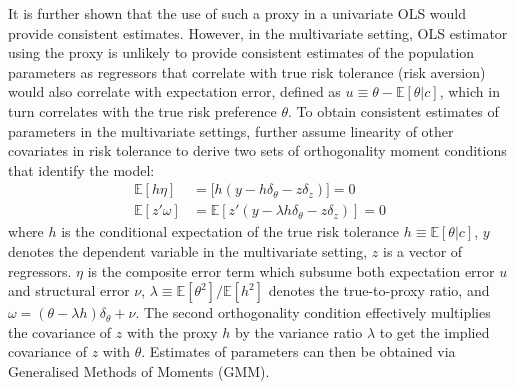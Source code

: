 \documentclass[]{article}
\begin{document}
It is further shown that the use of such a proxy in a univariate OLS would provide consistent estimates. However, in the multivariate setting, OLS estimator using the proxy is unlikely to provide consistent estimates of the population parameters as regressors that correlate with true risk tolerance (risk aversion) would also correlate with expectation error, defined as $u\equiv\theta-\mathbb E[\theta|c]$, which in turn correlates with the true risk preference $\theta$. To obtain consistent estimates of parameters in the multivariate settings, \citet{kimball2008imputing} further assume linearity of other covariates in risk tolerance to derive two sets of orthogonality moment conditions that identify the model: 
\begin{align}
\mathbb E[h\eta]&=\mathbb [h(y-h\delta_\theta-z\delta_z)]=0\\
\mathbb E[z'\omega]&=\mathbb E[z'(y-\lambda h\delta_\theta-z\delta_z)]=0
\end{align}
where $h$ is the conditional expectation of the true risk tolerance $h\equiv \mathbb E[\theta|c]$, $y$ denotes the dependent variable in the multivariate setting, $z$ is a vector of regressors. $\eta$ is the composite error term which subsume both expectation error $u$ and structural error $\nu$, $\lambda\equiv \mathbb E[\theta^2]/\mathbb E[h^2]$ denotes the true-to-proxy ratio, and $\omega=(\theta-\lambda h)\delta_\theta+\nu$. The second orthogonality condition effectively multiplies the covariance of $z$ with the proxy $h$ by the variance ratio $\lambda$ to get the implied covariance of $z$ with $\theta$. Estimates of parameters can then be obtained via Generalised Methods of Moments (GMM).
\end{document}
